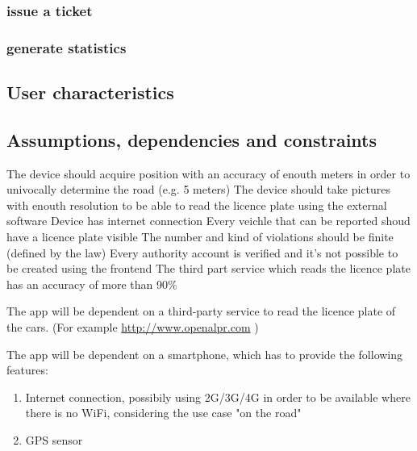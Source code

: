 \subsubsection{issue a ticket }
\subsubsection{generate statistics}

\subsection{User characteristics }


\subsection{Assumptions, dependencies and constraints}
\begin{enumerate}
 The device should acquire position with an accuracy of enouth meters in order to univocally determine the road (e.g. 5 meters)
 The device should take pictures with enouth resolution to be able to read the licence plate using the external software
\dom{}  Device has internet connection
 Every veichle that can be reported shoud have a licence plate visible
 The number and kind of violations should be finite (defined by the law)
 Every authority account is verified and it's not possible to be created using the frontend
 The third part service which reads the licence plate has an accuracy of more than 90\%

\end{enumerate}

The app will be dependent on a third-party service to read the licence plate of the cars. (For example \url{http://www.openalpr.com} )


The app will be dependent on a smartphone, which has to provide the following features:
\begin{enumerate}
  \item Internet connection, possibily using 2G/3G/4G in order to be available where there is no WiFi, considering the use case "on the road"
  \item GPS sensor
\end{enumerate}
